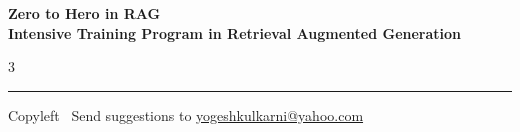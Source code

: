 \documentclass[8pt,landscape]{article}
\begin{document}
\footnotesize


\begin{center}
\Large{\textbf{Zero to Hero in RAG \\ Intensive Training Program in Retrieval Augmented Generation}}  
\end{center}

\begin{multicols}{3}

\end{multicols}

\rule{\linewidth}{0.25pt}
\scriptsize
Copyleft \textcopyleft\  Send suggestions to 
\href{http://www.yogeshkulkarni.com}{yogeshkulkarni@yahoo.com}
\end{document}
